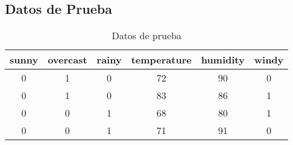 \subsection {Datos de Prueba} \label{subsec:Datos de Prueba}

\begin{table}[htbp]
    \centering
    \caption{Datos de prueba}
    \label{tab:datos_prueba}
    \begin{tabular}{|c|c|c|c|c|c|}
    \hline
    sunny & overcast & rainy & temperature & humidity & windy \\
    \hline
    0 & 1 & 0 & 72 & 90 & 0 \\
    0 & 1 & 0 & 83 & 86 & 1 \\
    0 & 0 & 1 & 68 & 80 & 1 \\
    0 & 0 & 1 & 71 & 91 & 0 \\
    \hline
    \end{tabular}
\end{table}
